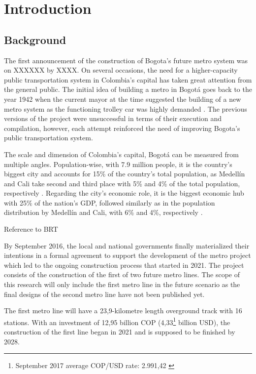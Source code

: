 \documentclass[12pt, a4paper]{report}
\begin{document}
\chapter{Introduction} \label{Chap1}

\section{Background}

The first announcement of the construction of Bogota's future metro system was on XXXXXX by XXXX. On several occasions, the need for a higher-capacity public transportation system in Colombia's capital has taken great attention from the general public. The initial idea of building a metro in Bogot\'{a} goes back to the year 1942 when the current mayor at the time suggested the building of a new metro system as the functioning trolley car was highly demanded \citep{metrodebogotaHistoriaMetroBogota2011}. The previous versions of the project were unsuccessful in terms of their execution and compilation, however, each attempt reinforced the need of improving Bogota's public transportation system.

The scale and dimension of Colombia's capital, Bogot\'{a} can be measured from multiple angles. Population-wise, with 7.9 million people, it is the country's biggest city and accounts for 15\% of the country's total population, as Medell\'{i}n and Cali take second and third place with 5\% and 4\% of the total population, respectively \citep{daneProyeccionesPoblacionPopulation2023}. Regarding the city's economic role, it is the biggest economic hub with 25\% of the nation's GDP, followed similarly as in the population distribution by Medell\'{i}n and Cali, with 6\% and 4\%, respectively \citep{daneCuentasNacionalesDepartamentales2023}.

Reference to BRT

By September 2016, the local and national governments finally materialized their intentions in a formal agreement to support the development of the metro project which led to the ongoing construction process that started in 2021. The project consists of the construction of the first of two future metro lines. The scope of this research will only include the first metro line in the future scenario as the final designs of the second metro line have not been published yet. 

The first metro line will have a 23,9-kilometre length overground track with 16 stations. With an investment of 12,95 billion COP (4,33\footnote{September 2017 average COP/USD rate: 2.991,42 \citep{bancodelarepublicaTasaCambioRepresentativa2023}} billion USD), the construction of the first line began in 2021 and is supposed to be finished by 2028.
\end{document}
